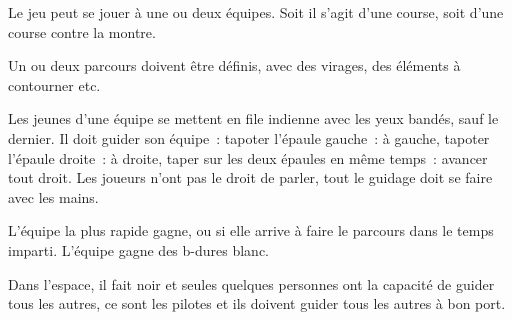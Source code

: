 \documentclass{grand-jeu}
\begin{document}
\begin{liste-materiel}
\end{liste-materiel}

\begin{regles}
Le jeu peut se jouer à une ou deux équipes. Soit il s’agit d’une course, soit d’une course contre la montre.

Un ou deux parcours doivent être définis, avec des virages, des éléments à contourner etc.

Les jeunes d’une équipe se mettent en file indienne avec les yeux bandés, sauf le dernier. Il doit guider son équipe : tapoter l’épaule gauche : à gauche, tapoter l’épaule droite : à droite, taper sur les deux épaules en même temps : avancer tout droit. Les joueurs n’ont pas le droit de parler, tout le guidage doit se faire avec les mains.

L’équipe la plus rapide gagne, ou si elle arrive à faire le parcours dans le temps imparti. L'équipe gagne des b-dures blanc.
\end{regles}

\begin{imaginaire}
Dans l’espace, il fait noir et seules quelques personnes ont la capacité de guider tous les autres, ce sont les pilotes et ils doivent guider tous les autres à bon port.
\end{imaginaire}

\begin{moments-stop}
\end{moments-stop}
\end{document}

